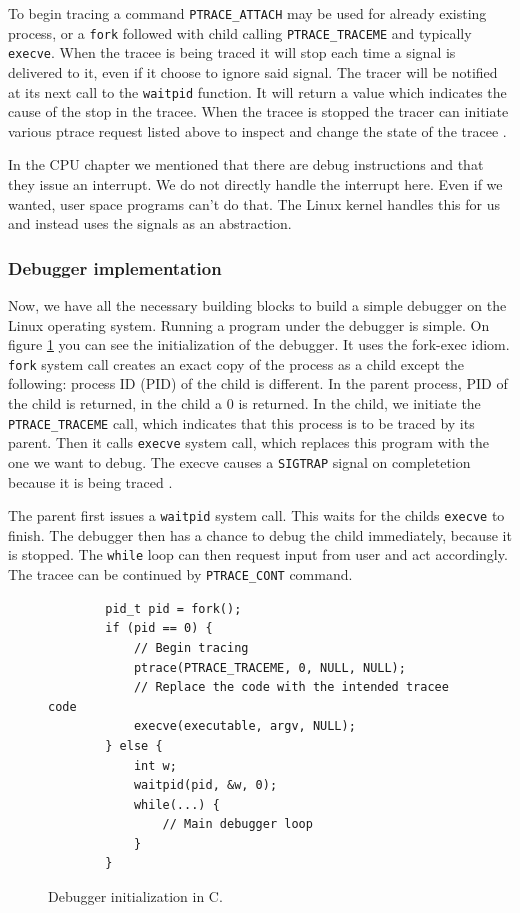 To begin tracing a command \texttt{PTRACE\_ATTACH} may be used for already
existing process, or a \texttt{fork} followed with child calling
\texttt{PTRACE\_TRACEME} and typically \texttt{execve}. When the tracee is
being traced it will stop each time a signal is delivered to it, even if it
choose to ignore said signal. The tracer will be notified at its next call to
the \texttt{waitpid} function. It will return a value which indicates the cause
of the stop in the tracee. When the tracee is stopped the tracer can initiate
various ptrace request listed above to inspect and change the state of the
tracee \cite{ptrace}.

In the CPU chapter we mentioned that there are debug instructions and that they
issue an interrupt. We do not directly handle the interrupt here. Even if we
wanted, user space programs can't do that. The Linux kernel handles this for us
and instead uses the signals as an abstraction. 

\subsubsection{Debugger implementation}
Now, we have all the necessary building blocks to build a simple debugger on
the Linux operating system. Running a program under the debugger is simple. On
figure \ref{fig:debugger-init} you can see the initialization of the debugger.
It uses the fork-exec idiom. \texttt{fork} system call creates an exact copy of
the process as a child except the following: process ID (PID) of the child is
different. In the parent process, PID of the child is returned, in the child a
$0$ is returned. In the child, we initiate the \texttt{PTRACE\_TRACEME} call,
which indicates that this process is to be traced by its parent. Then it calls
\texttt{execve} system call, which replaces this program with the one we want
to debug. The execve causes a \texttt{SIGTRAP} signal on completetion because
it is being traced \cite{execve}.

The parent first issues a \texttt{waitpid} system call. This waits for the
childs \texttt{execve} to finish. The debugger then has a chance to debug the
child immediately, because it is stopped. The \texttt{while} loop can then
request input from user and act accordingly. The tracee can be continued by
\texttt{PTRACE\_CONT} command.

\begin{figure}\label{fig:debugger-init}
    \begin{verbatim}
        pid_t pid = fork();
        if (pid == 0) {
            // Begin tracing
            ptrace(PTRACE_TRACEME, 0, NULL, NULL);
            // Replace the code with the intended tracee code
            execve(executable, argv, NULL);
        } else {
            int w;
            waitpid(pid, &w, 0);
            while(...) {
                // Main debugger loop
            }
        }
    \end{verbatim}
    \caption{Debugger initialization in C.}
\end{figure}

